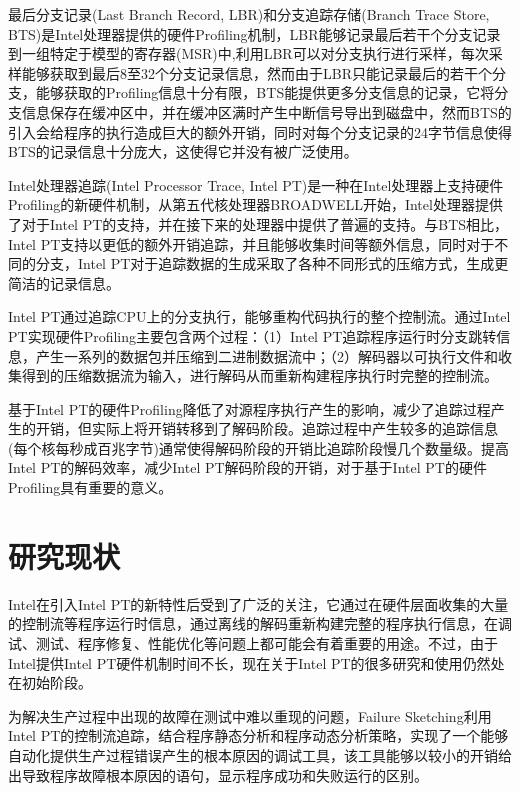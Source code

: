 最后分支记录(Last Branch Record, LBR)和分支追踪存储(Branch Trace Store, BTS)是Intel处理器提供的硬件Profiling机制，LBR能够记录最后若干个分支记录到一组特定于模型的寄存器(MSR)中,利用LBR可以对分支执行进行采样，每次采样能够获取到最后8至32个分支记录信息，然而由于LBR只能记录最后的若干个分支，能够获取的Profiling信息十分有限，BTS能提供更多分支信息的记录，它将分支信息保存在缓冲区中，并在缓冲区满时产生中断信号导出到磁盘中，然而BTS的引入会给程序的执行造成巨大的额外开销，同时对每个分支记录的24字节信息使得BTS的记录信息十分庞大，这使得它并没有被广泛使用。

Intel处理器追踪(Intel Processor Trace, Intel PT)是一种在Intel处理器上支持硬件Profiling的新硬件机制，从第五代核处理器BROADWELL开始，Intel处理器提供了对于Intel PT的支持，并在接下来的处理器中提供了普遍的支持。与BTS相比，Intel PT支持以更低的额外开销追踪，并且能够收集时间等额外信息，同时对于不同的分支，Intel PT对于追踪数据的生成采取了各种不同形式的压缩方式，生成更简洁的记录信息。

Intel PT通过追踪CPU上的分支执行，能够重构代码执行的整个控制流。通过Intel PT实现硬件Profiling主要包含两个过程：（1）Intel PT追踪程序运行时分支跳转信息，产生一系列的数据包并压缩到二进制数据流中；（2）解码器以可执行文件和收集得到的压缩数据流为输入，进行解码从而重新构建程序执行时完整的控制流。

基于Intel PT的硬件Profiling降低了对源程序执行产生的影响，减少了追踪过程产生的开销，但实际上将开销转移到了解码阶段。追踪过程中产生较多的追踪信息(每个核每秒成百兆字节)通常使得解码阶段的开销比追踪阶段慢几个数量级。提高Intel PT的解码效率，减少Intel PT解码阶段的开销，对于基于Intel PT的硬件Profiling具有重要的意义。

\section{研究现状}
Intel在引入Intel PT的新特性后受到了广泛的关注，它通过在硬件层面收集的大量的控制流等程序运行时信息，通过离线的解码重新构建完整的程序执行信息，在调试、测试、程序修复、性能优化等问题上都可能会有着重要的用途。不过，由于Intel提供Intel PT硬件机制时间不长，现在关于Intel PT的很多研究和使用仍然处在初始阶段。

为解决生产过程中出现的故障在测试中难以重现的问题，Failure Sketching利用Intel PT的控制流追踪，结合程序静态分析和程序动态分析策略，实现了一个能够自动化提供生产过程错误产生的根本原因的调试工具，该工具能够以较小的开销给出导致程序故障根本原因的语句，显示程序成功和失败运行的区别。

